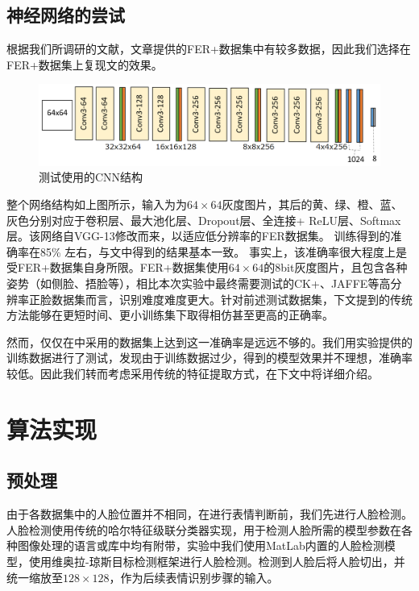 \documentclass[UTF8]{ctexart}
\begin{document}
\subsection{神经网络的尝试}
根据我们所调研的文献，文章\cite{BarsoumICMI2016}提供的FER+数据集中有较多数据，因此我们选择在FER+数据集上复现文\cite{BarsoumICMI2016}的效果。

\begin{figure}[ht]
  \includegraphics[width=\textwidth]{ferplus.png}
  \caption{测试使用的CNN结构}\label{fig:ferplus}
\end{figure}

整个网络结构如上图所示，输入为为$64\times 64$灰度图片，其后的黄、绿、橙、蓝、灰色分别对应于卷积层、最大池化层、Dropout层、全连接+ ReLU层、Softmax层。该网络自VGG-13修改而来，以适应低分辨率的FER数据集。
训练得到的准确率在85\% 左右，与文中得到的结果基本一致。
事实上，该准确率很大程度上是受FER+数据集自身所限。FER+数据集使用$64\times 64$的8bit灰度图片，且包含各种姿势（如侧脸、捂脸等），相比本次实验中最终需要测试的CK+、JAFFE等高分辨率正脸数据集而言，识别难度难度更大。针对前述测试数据集，下文提到的传统方法能够在更短时间、更小训练集下取得相仿甚至更高的正确率。

然而，仅仅在\cite{BarsoumICMI2016}中采用的数据集上达到这一准确率是远远不够的。我们用实验提供的训练数据进行了测试，发现由于训练数据过少，得到的模型效果并不理想，准确率较低。因此我们转而考虑采用传统的特征提取方式，在下文中将详细介绍。

\section{算法实现}

\subsection{预处理}

由于各数据集中的人脸位置并不相同，在进行表情判断前，我们先进行人脸检测。人脸检测使用传统的哈尔特征级联分类器实现，用于检测人脸所需的模型参数在各种图像处理的语言或库中均有附带，实验中我们使用MatLab内置的人脸检测模型，使用维奥拉-琼斯目标检测框架进行人脸检测。检测到人脸后将人脸切出，并统一缩放至$128\times 128$，作为后续表情识别步骤的输入。
\end{document}
